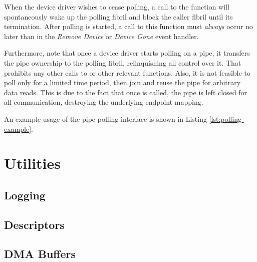 When the device driver wishes to cease polling, a call to the
 function will spontaneously wake up the polling fibril
and block the caller fibril until its termination. After polling is started, a
call to this function must \textit{always} occur no later than in the
\textit{Remove Device} or \textit{Device Gone} event handler.

Furthermore, note that once a device driver starts polling on a pipe, it
transfers the pipe ownership to the polling fibril, relinquishing all control
over it. That prohibits any other calls to  or other relevant
functions. Also, it is not feasible to poll only for a limited time period, then
join and reuse the pipe for arbitrary data reads. This is due to the fact that
once  is called, the pipe is left closed for all
communication, destroying the underlying endpoint mapping.

An example usage of the pipe polling interface is shown in Listing
\ref{lst:polling-example}.


\section{Utilities}

\subsection{Logging}

\subsection{Descriptors}

\subsection{DMA Buffers}


